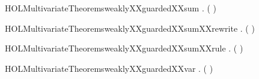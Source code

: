 \newcommand{\HOLMultivariateTheoremsweaklyXXguardedXXrules}{\UseVerbatim{HOLMultivariateTheoremsweaklyXXguardedXXrules}}
\begin{SaveVerbatim}{HOLMultivariateTheoremsweaklyXXguardedXXsum}
\HOLTokenTurnstile{} \HOLSymConst{\HOLTokenForall{}}  .
         ( \HOLSymConst{\ensuremath{+}} ) \HOLSymConst{\HOLTokenImp{}}
          \HOLSymConst{\HOLTokenConj{}}   
\end{SaveVerbatim}
\newcommand{\HOLMultivariateTheoremsweaklyXXguardedXXsum}{\UseVerbatim{HOLMultivariateTheoremsweaklyXXguardedXXsum}}
\begin{SaveVerbatim}{HOLMultivariateTheoremsweaklyXXguardedXXsumXXrewrite}
\HOLTokenTurnstile{} \HOLSymConst{\HOLTokenForall{}}  .
         ( \HOLSymConst{\ensuremath{+}} ) \HOLSymConst{\HOLTokenEquiv{}}
          \HOLSymConst{\HOLTokenConj{}}   
\end{SaveVerbatim}
\newcommand{\HOLMultivariateTheoremsweaklyXXguardedXXsumXXrewrite}{\UseVerbatim{HOLMultivariateTheoremsweaklyXXguardedXXsumXXrewrite}}
\begin{SaveVerbatim}{HOLMultivariateTheoremsweaklyXXguardedXXsumXXrule}
\HOLTokenTurnstile{} \HOLSymConst{\HOLTokenForall{}}  .
          \HOLSymConst{\HOLTokenConj{}}    \HOLSymConst{\HOLTokenImp{}}
         ( \HOLSymConst{\ensuremath{+}} )
\end{SaveVerbatim}
\newcommand{\HOLMultivariateTheoremsweaklyXXguardedXXsumXXrule}{\UseVerbatim{HOLMultivariateTheoremsweaklyXXguardedXXsumXXrule}}
\begin{SaveVerbatim}{HOLMultivariateTheoremsweaklyXXguardedXXvar}
\HOLTokenTurnstile{} \HOLSymConst{\HOLTokenForall{}} .   ( ) \HOLSymConst{\HOLTokenImp{}} \HOLSymConst{\HOLTokenNeg{}}  
\end{SaveVerbatim}
